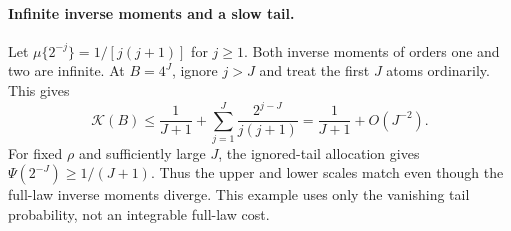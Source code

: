 \paragraph{Infinite inverse moments and a slow tail.}
Let $\mu\{2^{-j}\}=1/[j(j+1)]$ for $j\ge1$. Both inverse moments
of orders one and two are infinite. At $B=4^J$, ignore $j>J$ and
treat the first $J$ atoms ordinarily. This gives
\[
 \mathcal K(B)\le\frac1{J+1}
       +\sum_{j=1}^J\frac{2^{j-J}}{j(j+1)}
       =\frac1{J+1}+O(J^{-2}).
\]
For fixed $\rho$ and sufficiently large $J$, the ignored-tail allocation
gives $\Psi(2^{-J})\ge1/(J+1)$. Thus the upper and lower scales match
even though the full-law inverse moments diverge. This example uses
only the vanishing tail probability, not an integrable full-law cost.
